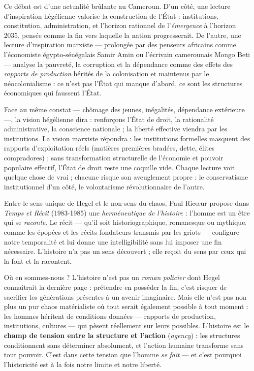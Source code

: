 \documentclass[11pt]{article}
\newcounter{popsec}
\newcounter{popsub}
\newcommand{\courssub}[1]{%
  \stepcounter{popsub}%
  \par\vspace{9pt}\noindent{\popxbold\fontsize{11.5}{13}\selectfont\color{popink}{\color{poporange}\thepopsec.\thepopsub}\hspace{6pt}#1}\par\nopagebreak\vspace{4pt}
}
\begin{document}
Ce débat est d'une actualité brûlante au Cameroun. D'un côté, une lecture d'inspiration hégélienne valorise la construction de l'État : institutions, constitution, administration, et l'horizon rationnel de l'\emph{émergence} à l'horizon 2035, pensée comme la fin vers laquelle la nation progresserait. De l'autre, une lecture d'inspiration marxiste — prolongée par des penseurs africains comme l'économiste égypto-sénégalais Samir Amin ou l'écrivain camerounais Mongo Beti — analyse la pauvreté, la corruption et la dépendance comme des effets des \emph{rapports de production} hérités de la colonisation et maintenus par le néocolonialisme : ce n'est pas l'État qui manque d'abord, ce sont les structures économiques qui faussent l'État.

\begin{exemplebox}
Face au même constat — chômage des jeunes, inégalités, dépendance extérieure —, la vision hégélienne dira : renforçons l'État de droit, la rationalité administrative, la conscience nationale ; la liberté effective viendra par les institutions. La vision marxiste répondra : les institutions formelles masquent des rapports d'exploitation réels (matières premières bradées, dette, élites compradores) ; sans transformation structurelle de l'économie et pouvoir populaire effectif, l'État de droit reste une coquille vide. Chaque lecture voit quelque chose de vrai ; chacune risque son aveuglement propre : le conservatisme institutionnel d'un côté, le volontarisme révolutionnaire de l'autre.
\end{exemplebox}

\begin{savaistu}
Entre le sens unique de Hegel et le non-sens du chaos, Paul Ricœur propose dans \emph{Temps et Récit} (1983-1985) une \emph{herméneutique de l'histoire} : l'homme est un être qui se \emph{raconte}. Le récit — qu'il soit historiographique, romanesque ou mythique, comme les épopées et les récits fondateurs transmis par les griots — configure notre temporalité et lui donne une intelligibilité sans lui imposer une fin nécessaire. L'histoire n'a pas un sens découvert ; elle reçoit du sens par ceux qui la font et la racontent.
\end{savaistu}

\courssub{Synthèse provisoire : ni roman policier, ni chaos}

Où en sommes-nous ? L'histoire n'est pas un \emph{roman policier} dont Hegel connaîtrait la dernière page : prétendre en posséder la fin, c'est risquer de sacrifier les générations présentes à un avenir imaginaire. Mais elle n'est pas non plus un pur chaos matérialiste où tout serait également possible à tout moment : les hommes héritent de conditions données — rapports de production, institutions, cultures — qui pèsent réellement sur leurs possibles. L'histoire est le \textbf{champ de tension entre la structure et l'action} (\emph{agency}) : les structures conditionnent sans déterminer absolument, et l'action humaine transforme sans tout pouvoir. C'est dans cette tension que l'homme \emph{se fait} — et c'est pourquoi l'historicité est à la fois notre limite et notre liberté.
\end{document}
